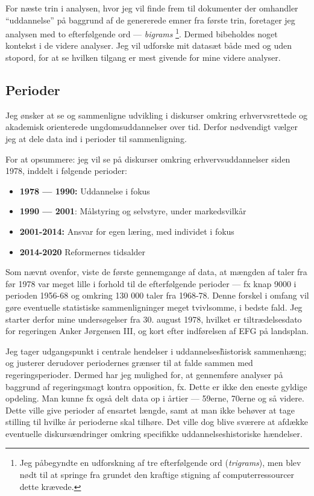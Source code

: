 For næste trin i analysen, hvor jeg vil finde frem til dokumenter der omhandler “uddannelse” på baggrund af de genererede emner fra første trin, foretager jeg analysen med to efterfølgende ord — \textit{bigrams} \footnote{Jeg påbegyndte en udforskning af tre efterfølgende ord (\textit{trigrams}), men blev nødt til at springe fra grundet den kraftige stigning af computerressourcer dette krævede.}.
Dermed bibeholdes noget kontekst i de videre analyser.
Jeg vil udforske mit datasæt både med og uden stopord, for at se hvilken tilgang er mest givende for mine videre analyser.

\subsection{Perioder}\label{sec:periods}
Jeg ønsker at se og sammenligne udvikling i diskurser omkring erhvervsrettede og akademisk orienterede ungdomsuddannelser over tid.
Derfor nødvendigt vælger jeg at dele data ind i perioder til sammenligning.

For at opsummere: jeg vil se på diskurser omkring erhvervsuddannelser siden 1978, inddelt i følgende perioder:

\begin{itemize}
  \item
    \textbf{1978 — 1990:} Uddannelse i fokus
  \item
    \textbf{1990 — 2001}: Målstyring og selvstyre, under markedsvilkår
  \item
    \textbf{2001-2014:} Ansvar for egen læring, med individet i fokus
  \item
    \textbf{2014-2020} Reformernes tidsalder
\end{itemize}

Som nævnt ovenfor, viste de første gennemgange af data, at mængden af taler fra før 1978 var meget lille i forhold til de efterfølgende perioder — fx knap 9000 i perioden 1956-68 og omkring 130 000 taler fra 1968-78.
Denne forskel i omfang vil gøre eventuelle statistiske sammenligninger meget tvivlsomme, i bedste fald.
Jeg starter derfor mine undersøgelser fra 30. august 1978, hvilket er tiltrædelsesdato for regeringen Anker Jørgensen III, og kort efter indførelsen af EFG på landsplan.

Jeg tager udgangspunkt i centrale hendelser i uddannelses\~historisk sammenhæng; og justerer derudover periodernes grænser til at falde sammen med regeringsperioder.
Dermed har jeg mulighed for, at gennemføre analyser på baggrund af regeringsmagt kontra opposition, fx.
Dette er ikke den eneste gyldige opdeling.
Man kunne fx også delt data op i årtier — 59erne, 70erne og så videre.
Dette ville give perioder af ensartet længde, samt at man ikke behøver at tage stilling til hvilke år perioderne skal tilhøre.
Det ville dog blive sværere at afdække eventuelle diskursændringer omkring specifikke uddannelseshistoriske hændelser.

